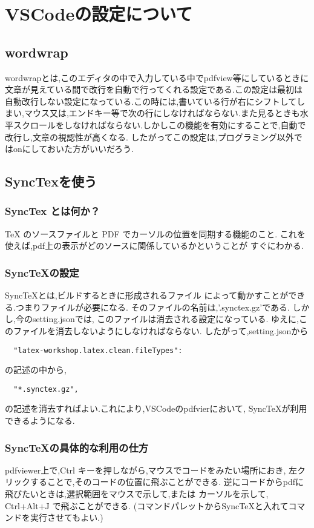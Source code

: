 \documentclass{ltjsarticle}
\begin{document}
\section{VSCodeの設定について}
\subsection{wordwrap}
wordwrapとは,このエディタの中で入力している中でpdfview等にしているときに文章が見えている間で改行を自動で行ってくれる設定である.この設定は最初は自動改行しない設定になっている.この時には,書いている行が右にシフトしてしまい,マウス又は,エンドキー等で次の行にしなければならない.また見るときも水平スクロールをしなければならない.しかしこの機能を有効にすることで,自動で改行し,文章の視認性が高くなる.
したがってこの設定は,プログラミング以外ではonにしておいた方がいいだろう.
\subsection{SyncTexを使う}
\subsubsection*{SyncTex とは何か？}
TeX のソースファイルと PDF でカーソルの位置を同期する機能のこと.
これを使えば,pdf上の表示がどのソースに関係しているかということが
すぐにわかる.
\subsubsection*{SyncTeXの設定}
SyncTeXとは,ビルドするときに形成されるファイル
によって動かすことができる.つまりファイルが必要になる.
そのファイルの名前は,'.synctex.gz'である.
しかし,今のsetting.jsonでは,
このファイルは消去される設定になっている.
ゆえに,このファイルを消去しないようにしなければならない.
したがって,setting.jsonから
\begin{verbatim}
  "latex-workshop.latex.clean.fileTypes":
\end{verbatim}
の記述の中から,
\begin{verbatim}
  "*.synctex.gz",
\end{verbatim}
の記述を消去すればよい.これにより,VSCodeのpdfvierにおいて,
SyncTeXが利用できるようになる.
\subsubsection*{SyncTeXの具体的な利用の仕方}
pdfviewer上で,Ctrl キーを押しながら,マウスでコードをみたい場所におき,
左クリックすることで,そのコードの位置に飛ぶことができる.
逆にコードからpdfに飛びたいときは,選択範囲をマウスで示して,または
カーソルを示して, Ctrl+Alt+J で飛ぶことができる.
(コマンドパレットからSyncTeXと入れてコマンドを実行させてもよい.)
\end{document}
